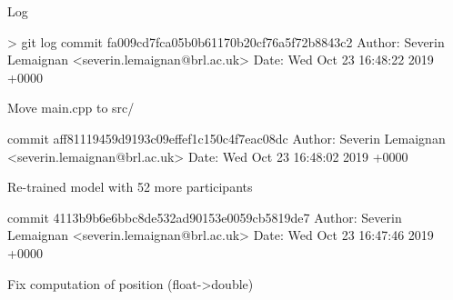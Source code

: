 \documentclass[compress]{beamer}
\begin{document}
\begin{frame}[fragile]{Log}
\begin{shcode}
> git log
commit fa009cd7fca05b0b61170b20cf76a5f72b8843c2
Author: Severin Lemaignan <severin.lemaignan@brl.ac.uk>
Date:   Wed Oct 23 16:48:22 2019 +0000

    Move main.cpp to src/

commit aff81119459d9193c09effef1c150c4f7eac08dc
Author: Severin Lemaignan <severin.lemaignan@brl.ac.uk>
Date:   Wed Oct 23 16:48:02 2019 +0000

    Re-trained model with 52 more participants

commit 4113b9b6e6bbc8de532ad90153e0059cb5819de7
Author: Severin Lemaignan <severin.lemaignan@brl.ac.uk>
Date:   Wed Oct 23 16:47:46 2019 +0000

    Fix computation of position (float->double)
\end{shcode}


\end{frame}

\begin{frame}{}

\centering


\end{frame}
\end{document}
